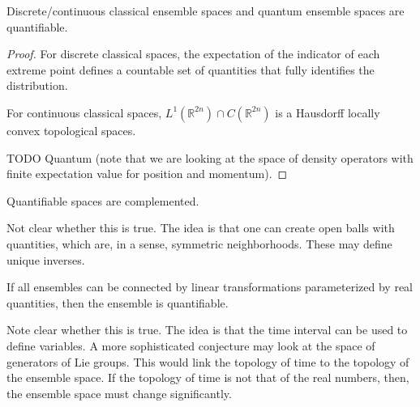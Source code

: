 \begin{conj}
	Discrete/continuous classical ensemble spaces and quantum ensemble spaces are quantifiable.
\end{conj}

\begin{proof}
	For discrete classical spaces, the expectation of the indicator of each extreme point defines a countable set of quantities that fully identifies the distribution.
	
	For continuous classical spaces, $L^1(\mathbb{R}^{2n}) \cap C(\mathbb{R}^{2n})$ is a Hausdorff locally convex topological spaces.
	
	TODO Quantum (note that we are looking at the space of density operators with finite expectation value for position and momentum).
\end{proof}

\begin{conj}
	Quantifiable spaces are complemented.
\end{conj}

\begin{remark}
	Not clear whether this is true. The idea is that one can create open balls with quantities, which are, in a sense, symmetric neighborhoods. These may define unique inverses.
\end{remark}

\begin{conj}
	If all ensembles can be connected by linear transformations parameterized by real quantities, then the ensemble is quantifiable.
\end{conj}

\begin{remark}
	Note clear whether this is true. The idea is that the time interval can be used to define variables. A more sophisticated conjecture may look at the space of generators of Lie groups. This would link the topology of time to the topology of the ensemble space. If the topology of time is not that of the real numbers, then, the ensemble space must change significantly.
\end{remark}


